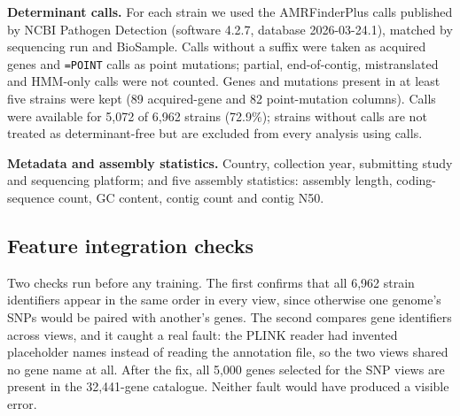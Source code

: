 \textbf{Determinant calls.} For each strain we used the AMRFinderPlus
\cite{feldgarden2019amrfinder,feldgarden2021amrfinderplus} calls published by NCBI Pathogen
Detection \cite{ncbi_pathogen_detection} (software 4.2.7, database 2026-03-24.1), matched by
sequencing run and BioSample. Calls without a suffix were taken as acquired genes and
\texttt{=POINT} calls as point mutations; partial, end-of-contig, mistranslated and HMM-only calls
were not counted. Genes and mutations present in at least five strains were kept (89 acquired-gene
and 82 point-mutation columns). Calls were available for 5,072 of 6,962 strains (72.9\%); strains
without calls are not treated as determinant-free but are excluded from every analysis using calls.

\textbf{Metadata and assembly statistics.} Country, collection year, submitting study and
sequencing platform; and five assembly statistics: assembly length, coding-sequence count, GC
content, contig count and contig N50.

\subsection*{Feature integration checks}
Two checks run before any training. The first confirms that all 6,962 strain identifiers appear in
the same order in every view, since otherwise one genome's SNPs would be paired with another's
genes. The second compares gene identifiers across views, and it caught a real fault: the PLINK
reader had invented placeholder names instead of reading the annotation file, so the two views
shared no gene name at all. After the fix, all 5,000 genes selected for the SNP views are present
in the 32,441-gene catalogue. Neither fault would have produced a visible error.
